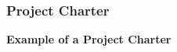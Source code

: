 \documentclass{beamer}
\begin{document}
\begin{frame}
\frametitle{Project Charter}
\textbf{Example of a Project Charter}
\vspace{-0.2cm}
\begin{columns}
\begin{figure}
\end{figure}
\begin{figure}

\end{figure}
\end{columns}
\end{frame}
\end{document}
